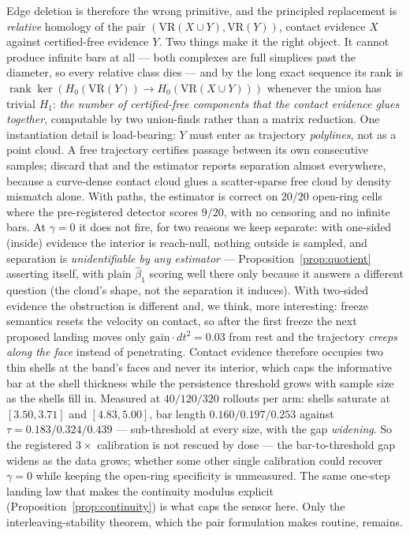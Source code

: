 \documentclass[11pt]{article}
\theoremstyle{remark}
\begin{document}
Edge deletion is therefore the wrong primitive, and the principled
replacement is \emph{relative} homology of the pair
$(\mathrm{VR}(X \cup Y), \mathrm{VR}(Y))$, contact evidence $X$ against
certified-free evidence $Y$. Two things make it the right object. It
cannot produce infinite bars at all --- both complexes are full
simplices past the diameter, so every relative class dies --- and by the
long exact sequence its rank is $\operatorname{rank}\ker(H_0(\mathrm{VR}(Y))
\to H_0(\mathrm{VR}(X \cup Y)))$ whenever the union has trivial $H_1$:
\emph{the number of certified-free components that the contact evidence
glues together}, computable by two union-finds rather than a matrix
reduction. One instantiation detail is load-bearing: $Y$ must enter as
trajectory \emph{polylines}, not as a point cloud. A free trajectory certifies
passage between its own consecutive samples; discard that and the
estimator reports separation almost everywhere, because a curve-dense
contact cloud glues a scatter-sparse free cloud by density mismatch
alone. With paths, the estimator is correct on $20/20$ open-ring cells
where the pre-registered detector scores $9/20$, with no censoring and
no infinite bars. At $\gamma = 0$ it does not fire, for two reasons we
keep separate: with one-sided (inside) evidence the interior is
reach-null, nothing outside is sampled, and separation is
\emph{unidentifiable by any estimator} --- Proposition~\ref{prop:quotient}
asserting itself, with plain $\hat\beta_1$ scoring well there only
because it answers a different question (the cloud's shape, not the
separation it induces). With two-sided evidence the obstruction is
different and, we think, more interesting: freeze semantics resets the
velocity on contact, so after the first freeze the next proposed landing
moves only $\mathrm{gain}\cdot dt^2 = 0.03$ from rest and the trajectory
\emph{creeps along the face} instead of penetrating. Contact evidence
therefore occupies two thin shells at the band's faces and never its
interior, which caps the informative bar at the shell thickness while
the persistence threshold grows with sample size as the shells fill in.
Measured at $40/120/320$ rollouts per arm: shells saturate at
$[3.50, 3.71]$ and $[4.83, 5.00]$, bar length $0.160/0.197/0.253$
against $\tau = 0.183/0.324/0.439$ --- sub-threshold at every size, with
the gap \emph{widening}. So the registered $3\times$ calibration is not
rescued by dose --- the bar-to-threshold gap widens as the data grows;
whether some other single calibration could recover $\gamma = 0$ while
keeping the open-ring specificity is unmeasured.
The same one-step landing law that makes the continuity modulus explicit
(Proposition~\ref{prop:continuity}) is what caps the sensor here. Only
the interleaving-stability theorem, which the pair formulation makes
routine, remains.
\end{document}
